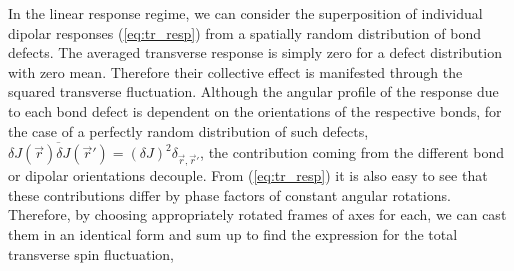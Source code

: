 \documentclass[twocolumn,english,aps,prl,floatfix]{revtex4-1}
\begin{document}
In the linear response regime, we can consider the superposition of
individual dipolar responses (\ref{eq:tr_resp}) from a spatially
random distribution of bond defects. The averaged transverse response
is simply zero for a defect distribution with zero mean. Therefore 
their collective effect is manifested through the squared transverse
fluctuation. Although the angular profile of the response due 
to each bond defect is dependent on the orientations
of the respective bonds, for the case of a perfectly random 
distribution of such defects, 
$\overline{\delta J(\vec{r})\delta J(\vec{r}')}=
(\delta J)^2\delta_{\vec{r},\vec{r}'}$, the contribution coming
from the different bond or dipolar orientations decouple. From
(\ref{eq:tr_resp}) it is also easy to see that these contributions
differ by phase factors of constant angular rotations. Therefore, by 
choosing appropriately rotated frames of axes for each, we can cast 
them in an identical form and sum up to find the expression for the 
total transverse spin fluctuation,
\end{document}

